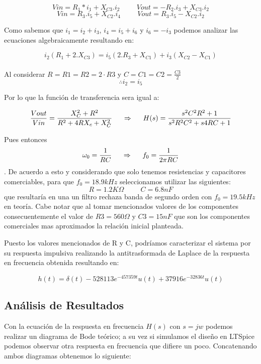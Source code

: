 $$Vin = R_1 *i_1 + X_{C3}.i_2 \hspace{1cm} Vout = -R_2 .i_3 + X_{C3}.i_2$$
$$Vin = R_3 .i_5 + X_{C2}.i_4 \hspace{1cm} Vout = R_3 .i_5 - X_{C2}.i_2$$

Como sabemos que $i_1 = i_2 + i_3$, $i_4 = i_5 + i_6$ y $i_6 = - i_3$ podemos analizar las ecuaciones algebraicamente resultando en:

$$i_2 (R_1 + 2.X_{C3}) = i_5 (2.R_3+X_{C1}) + i_3 (X_{C2} - X_{C1})$$\\


Al considerar $R = R1 = R2 = 2 \cdot R3$ y $C = C1 = C2 = \frac{C3}{2}$ 
$$\therefore i_2 = i_5$$

Por lo que la función de transferencia sera igual a:

$$\frac{Vout}{Vin} = \frac{X_C^2 + R^2}{R^2 + 4RX_c + X_C^2} \hspace{0.5cm}\Rightarrow \hspace{0.5cm} H(s) = \frac{s^2C^2R^2 + 1}{s^2R^2C^2 + s4RC + 1}$$

Pues entonces $$\omega_0 = \frac{1}{RC} \hspace{0.5cm} \Rightarrow \hspace{0.5cm} f_0 = \frac{1}{2\pi RC}$$. De acuerdo a esto y considerando que solo tenemos resistencias y capacitores comerciables, para que $f_0 = 18.9kHz$ seleccionamos utilizar las siguientes:
$$R = 1.2K\Omega \hspace{1cm} C = 6.8nF$$ que resultaría en una un filtro rechaza banda de segundo orden con $f_0 = 19.5kHz$ en teoría. Cabe notar que al tomar mencionados valores de los componentes consecuentemente el valor de $R3 = 560\Omega$ y $C3 = 15nF$ que son los componentes comerciales mas aproximados la relación inicial planteada.

Puesto los valores mencionados de R y C, podríamos caracterizar el sistema por su respuesta impulsiva realizando la antitrasformada de Laplace de la respuesta en frecuencia obtenida resultando en:

$$h(t) = \delta (t) - 528113e^{-457359t}u(t) + 37916e^{-32836t}u(t)$$



\subsection{Análisis de Resultados}

Con la ecuación de la respuesta en frecuencia $H(s)$ con $s=jw$ podemos realizar un diagrama de Bode teórico; a su vez si simulamos el diseño en LTSpice podemos observar otra respuesta en frecuencia que difiere un poco. Concatenando ambos diagramas obtenemos lo siguiente:


